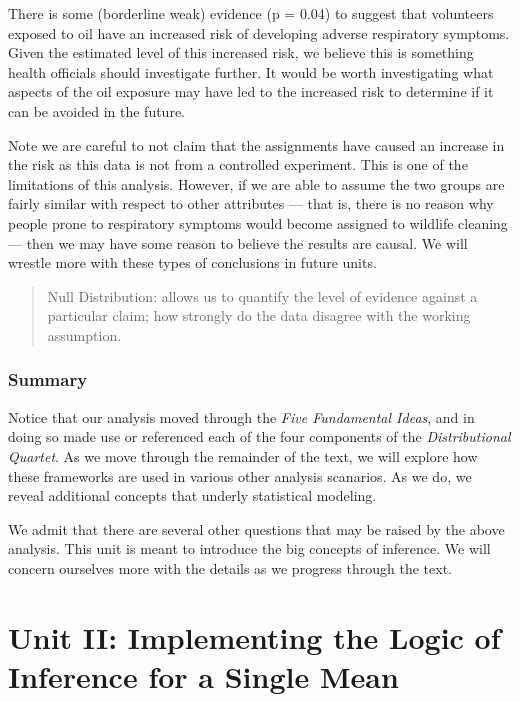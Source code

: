 \documentclass[
]{book}
\theoremstyle{plain}
\theoremstyle{mydefn}
\theoremstyle{myexmpl}
\theoremstyle{remark}
\begin{document}
There is some (borderline weak) evidence (p = 0.04) to suggest that volunteers exposed to oil have an increased risk of developing adverse respiratory symptoms. Given the estimated level of this increased risk, we believe this is something health officials should investigate further. It would be worth investigating what aspects of the oil exposure may have led to the increased risk to determine if it can be avoided in the future.

Note we are careful to not claim that the assignments have caused an increase in the risk as this data is not from a controlled experiment. This is one of the limitations of this analysis. However, if we are able to assume the two groups are fairly similar with respect to other attributes --- that is, there is no reason why people prone to respiratory symptoms would become assigned to wildlife cleaning --- then we may have some reason to believe the results are causal. We will wrestle more with these types of conclusions in future units.

\begin{quote}
Null Distribution: allows us to quantify the level of evidence against a particular claim; how strongly do the data disagree with the working assumption.
\end{quote}

\hypertarget{summary}{%
\section{Summary}\label{summary}}

Notice that our analysis moved through the \emph{Five Fundamental Ideas}, and in doing so made use or referenced each of the four components of the \emph{Distributional Quartet}. As we move through the remainder of the text, we will explore how these frameworks are used in various other analysis scanarios. As we do, we reveal additional concepts that underly statistical modeling.

We admit that there are several other questions that may be raised by the above analysis. This unit is meant to introduce the big concepts of inference. We will concern ourselves more with the details as we progress through the text.

\hypertarget{part-unit-ii-implementing-the-logic-of-inference-for-a-single-mean}{%
\part{Unit II: Implementing the Logic of Inference for a Single Mean}\label{part-unit-ii-implementing-the-logic-of-inference-for-a-single-mean}}
\end{document}
